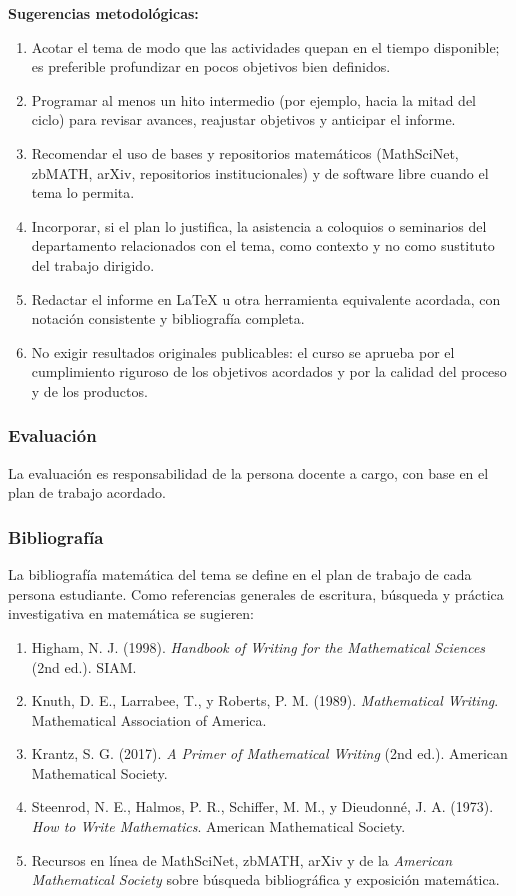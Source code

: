 \begin{refsection}
\textbf{Sugerencias metodológicas:}

\begin{enumerate}
    \item Acotar el tema de modo que las actividades quepan en el tiempo disponible; es preferible profundizar en pocos objetivos bien definidos.
    \item Programar al menos un hito intermedio (por ejemplo, hacia la mitad del ciclo) para revisar avances, reajustar objetivos y anticipar el informe.
    \item Recomendar el uso de bases y repositorios matemáticos (MathSciNet, zbMATH, arXiv, repositorios institucionales) y de software libre cuando el tema lo permita.
    \item Incorporar, si el plan lo justifica, la asistencia a coloquios o seminarios del departamento relacionados con el tema, como contexto y no como sustituto del trabajo dirigido.
    \item Redactar el informe en \LaTeX{} u otra herramienta equivalente acordada, con notación consistente y bibliografía completa.
    \item No exigir resultados originales publicables: el curso se aprueba por el cumplimiento riguroso de los objetivos acordados y por la calidad del proceso y de los productos.
\end{enumerate}

\subsubsection*{Evaluación}

La evaluación es responsabilidad de la persona docente a cargo, con base en el plan de trabajo acordado.

\subsubsection*{Bibliografía}

La bibliografía matemática del tema se define en el plan de trabajo de cada persona estudiante. Como referencias generales de escritura, búsqueda y práctica investigativa en matemática se sugieren:

\begin{enumerate}
\item Higham, N. J. (1998). \emph{Handbook of Writing for the Mathematical Sciences} (2nd ed.). SIAM.
\item Knuth, D. E., Larrabee, T., y Roberts, P. M. (1989). \emph{Mathematical Writing}. Mathematical Association of America.
\item Krantz, S. G. (2017). \emph{A Primer of Mathematical Writing} (2nd ed.). American Mathematical Society.
\item Steenrod, N. E., Halmos, P. R., Schiffer, M. M., y Dieudonné, J. A. (1973). \emph{How to Write Mathematics}. American Mathematical Society.
\item Recursos en línea de MathSciNet, zbMATH, arXiv y de la \emph{American Mathematical Society} sobre búsqueda bibliográfica y exposición matemática.
\end{enumerate}

\nocite{Kra17}

\end{refsection}
